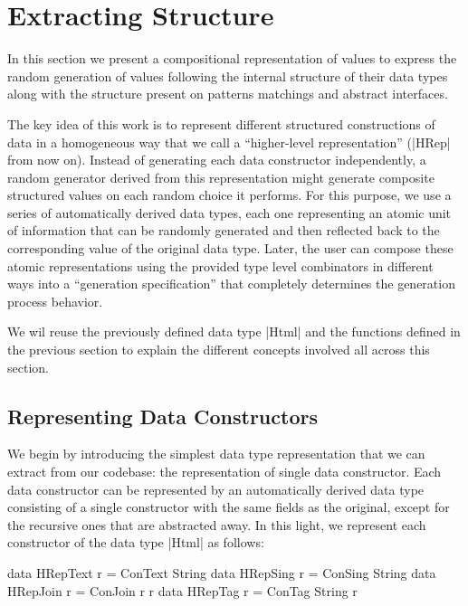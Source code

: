 \section{Extracting Structure} \label{sec:hrep}

In this section we present a compositional representation of values to express
the random generation of values following the internal structure of their data
types along with the structure present on patterns matchings and abstract
interfaces.


The key idea of this work is to represent different structured constructions of
data in a homogeneous way that we call a ``higher-level representation'' (|HRep|
from now on).
%
Instead of generating each data constructor independently, a random generator
derived from this representation might generate composite structured values on
each random choice it performs.
%
%
For this purpose, we use a series of automatically derived data types, each one
representing an atomic unit of information that can be randomly generated and
then reflected back to the corresponding value of the original data type.
%
Later, the user can compose these atomic representations using the provided type
level combinators in different ways into a ``generation specification'' that
completely determines the generation process behavior.


We wil reuse the previously defined data type |Html| and the functions defined
in the previous section to explain the different concepts involved all across
this section.


\subsection*{\textbf{Representing Data Constructors}}

We begin by introducing the simplest data type representation that we can
extract from our codebase: the representation of single data constructor.
%
Each data constructor can be represented by an automatically derived data type
consisting of a single constructor with the same fields as the original, except
for the recursive ones that are abstracted away.
%
In this light, we represent each constructor of the data type |Html| as follows:

\begin{code}
data HRepText  r = ConText  String
data HRepSing  r = ConSing  String
data HRepJoin  r = ConJoin  r r
data HRepTag   r = ConTag   String r
\end{code}

